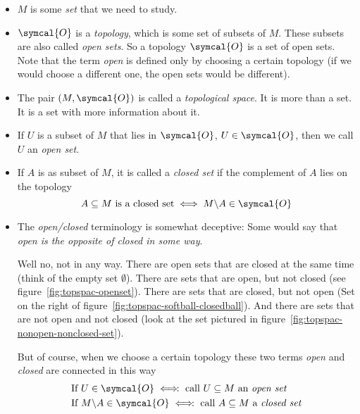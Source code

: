 \begin{itemize}
  \item $M$ is some \emph{set} that we need to study.
  \item $\symcal{O}$ is a \emph{topology}, which is some set of subsets of $M$.
    These subsets are also called \emph{open sets}. So a topology $\symcal{O}$
    is a set of open sets. Note that the term \emph{open} is defined only by
    choosing a certain topology (if we would choose a different one, the open
    sets would be different).
  \item The pair $(M, \symcal{O})$ is called a \emph{topological space}.
    It is more than a set. It is a set with more information about it.
  \item If $U$ is a subset of $M$ that lies in $\symcal{O}$, $U\in\symcal{O}$,
    then we call $U$ an \emph{open set}.
  \item If $A$ is as subset of $M$, it is called a \emph{closed set} if the
    complement of $A$ lies on the topology
    \[
      A\subseteq M \text{ is a closed set} \iff  M\backslash A\in\symcal{O}
    \]
  \item The \emph{open/closed} terminology is somewhat deceptive:
    Some would say that \emph{open is the opposite of closed in some way}.

    Well no, not in any way. There are open sets that are closed at the same
    time (think of the empty set $\emptyset$).
    There are sets that are open, but not closed (see
    figure~\ref{fig:topspac-openset}).
    There are sets that are closed, but not open (Set on the right of
    figure~\ref{fig:topspac-softball-closedball}).
    And there are sets that are not open and not closed (look at the set
    pictured in figure~\ref{fig:topspac-nonopen-nonclosed-set}).

    But of course, when we choose a certain topology these two terms
    \emph{open} and \emph{closed} are connected in this way
    \begin{align*}
      & \text{If } U\in\symcal{O}
        \iff\hspace{-0.4em}: \text{ call } U\subseteq M
        \text{ an \emph{open set}}\\
      & \text{If } M\backslash A\in\symcal{O}
        \iff\hspace{-0.4em} : \text{ call } A\subseteq M
        \text{ a \emph{closed set}}
    \end{align*}
    
  \end{itemize}
  
